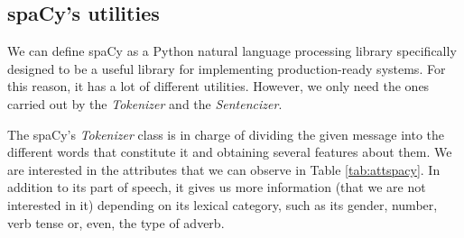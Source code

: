 \subsection{spaCy's utilities}\label{ssect:spacyut}
We can define spaCy as a Python natural language processing library specifically designed to be a useful library for implementing production-ready systems. For this reason, it has a lot of different utilities. However, we only need the ones carried out by the \textit{Tokenizer} and the \textit{Sentencizer}.

The spaCy's \textit{Tokenizer} class is in charge of dividing the given message into the different words that constitute it and obtaining several features about them. We are interested in the attributes that we can observe in Table \ref{tab:attspacy}. In addition to its part of speech, it gives us more information (that we are not interested in it) depending on its lexical category, such as its gender, number, verb tense or, even, the type of adverb.

